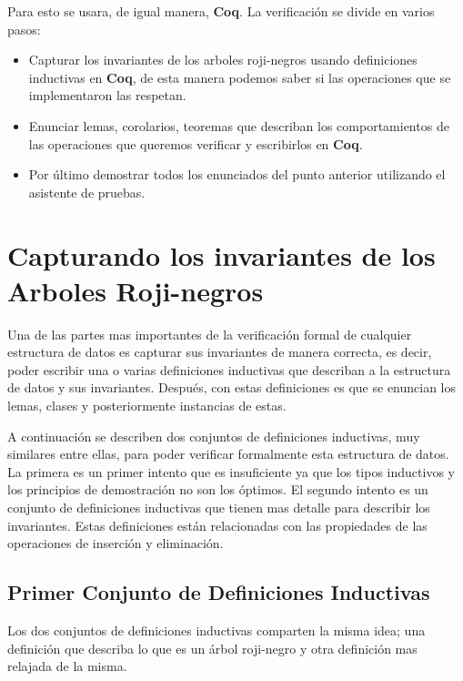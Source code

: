 \documentclass[letterpaper,12pt,oneside]{book}
\newcommand{\coq}{\textbf{Coq}}
\newcommand{\Arns}{Arboles Roji-negros}
\newcommand{\arn}{árbol roji-negro}
\newcommand{\arns}{arboles roji-negros}
\theoremstyle{plain}
\theoremstyle{definition}
\theoremstyle{remark}
\begin{document}
Para esto se usara, de igual manera, {\coq}. La verificaci\'on se divide en varios pasos:
\begin{itemize}
    \item Capturar los invariantes de los {\arns} usando definiciones inductivas en {\coq}, de esta 
    manera podemos saber si las operaciones que se implementaron las respetan.
    \item Enunciar lemas, corolarios, teoremas que describan los comportamientos de las operaciones que 
    queremos verificar y escribirlos en {\coq}.
    \item Por \'ultimo demostrar todos los enunciados del punto anterior utilizando el asistente de 
    pruebas.
\end{itemize}{}
\section{Capturando los invariantes de los {\Arns}}
Una de las partes mas importantes de la verificaci\'on formal de cualquier estructura de datos es 
capturar sus invariantes de manera correcta, es decir, poder escribir una o varias definiciones 
inductivas que describan a la estructura de datos y sus invariantes. Después, con estas 
definiciones es que se enuncian los lemas, clases y posteriormente instancias de estas. 

A continuaci\'on se describen dos conjuntos de definiciones inductivas, muy similares entre ellas, para 
poder verificar formalmente esta estructura de datos. La primera es un primer intento que es insuficiente
ya que los tipos inductivos y los principios de demostraci\'on no son los \'optimos. El segundo intento 
es un conjunto de definiciones inductivas que tienen mas detalle para describir los invariantes. Estas 
definiciones est\'an relacionadas con las propiedades de las operaciones de inserci\'on y eliminaci\'on. 

\subsection{Primer Conjunto de Definiciones Inductivas}
Los dos conjuntos de definiciones inductivas comparten la misma idea; una definici\'on que describa lo 
que es un {\arn} y otra definici\'on mas relajada de la misma.
\end{document}
